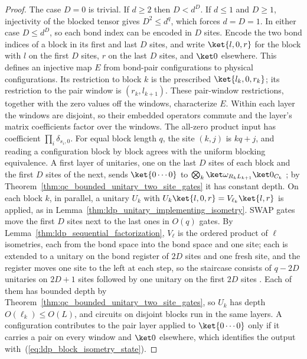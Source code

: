 \begin{proof}
    \leanok
    The case $D=0$ is trivial. If $d\ge2$ then $D<d^D$. If $d\le1$ and
    $D\ge1$, injectivity of the blocked tensor gives $D^2\le d^q$, which
    forces $d=D=1$. In either case $D\le d^D$, so each bond index can be
    encoded in $D$ sites. Encode the two bond indices
    of a block in its first and last $D$ sites, and write $\ket{l,0,r}$ for the block with $l$ on the first $D$ sites, $r$
    on the last $D$ sites, and $\ket0$ elsewhere. This defines an injective map $E$ from
    bond-pair configurations to physical configurations. Its restriction to
    block $k$ is the prescribed $\ket{l_k,0,r_k}$; its restriction to the
    pair window is $(r_k,l_{k+1})$. These pair-window restrictions, together
    with the zero values off the windows, characterize $E$.
    Within each layer the windows are disjoint, so their embedded operators
    commute and the layer's matrix coefficients factor over the windows.
    The all-zero product input has coefficient $\prod_i\delta_{s_i,0}$.
    For equal block length $q$, the site $(k,j)$ is $kq+j$, and reading a
    configuration block by block agrees with the uniform blocking equivalence.
    A first layer of unitaries,
    one on the last $D$ sites of each block and the first $D$ sites of the
    next, sends $\ket{0\cdots0}$ to
    $\bigotimes_k\ket\omega_{R_kL_{k+1}}\ket0_{C_k}$
    \cite[eq.~(12)]{Malz2024Preparation}; by
    Theorem~\ref{thm:qc_bounded_unitary_two_site_gates} it has constant depth.
    On each block $k$, in parallel, a unitary $U_k$ with
    $U_k\ket{l,0,r}=V_{\ell_k}\ket{l,r}$ is applied, as in
    Lemma~\ref{thm:ldp_unitary_implementing_isometry}. SWAP
    gates move the first $D$ sites next to the last ones in $O(q)$ gates.
    By Lemma~\ref{thm:ldp_sequential_factorization}, $V_\ell$ is the ordered
    product of $\ell$ isometries, each from the bond space into the bond space
    and one site; each is extended to a unitary on the bond register of $2D$
    sites and one fresh site, and the register moves one site to the left at
    each step, so the staircase consists of $q-2D$ unitaries on $2D+1$ sites
    followed by one unitary on the first $2D$ sites
    \cite[paragraph ``The sequential-RG circuit'']{Malz2024Preparation}. Each
    of them has bounded depth by
    Theorem~\ref{thm:qc_bounded_unitary_two_site_gates}, so $U_k$ has depth
    $O(\ell_k)\le O(L)$, and circuits on disjoint blocks run in the same layers.
    A configuration contributes to the pair layer applied to $\ket{0\cdots0}$
    only if it carries a pair on every window and $\ket0$ elsewhere, which
    identifies the output with~(\ref{eq:ldp_block_isometry_state}).
\end{proof}

